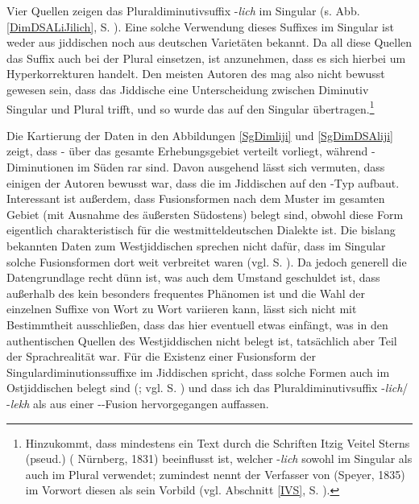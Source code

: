 Vier Quellen zeigen das Pluraldiminutivsuffix -\textit{lich} im Singular (s. Abb. \ref{DimDSALiJilich}, S. \pageref{DimDSALiJilich}). Eine solche Verwendung dieses Suffixes im Singular ist weder aus jiddischen noch aus deutschen Varietäten bekannt. Da all diese Quellen das Suffix auch  bei der  Plural einsetzen, ist anzunehmen, dass es sich hierbei um Hyperkorrekturen handelt.\label{lichHyper} Den meisten Autoren des  mag also nicht bewusst gewesen sein, dass das Jiddische eine Unterscheidung zwischen Diminutiv Singular und Plural trifft, und so wurde das   auf den Singular übertragen.\footnote{Hinzukommt, dass mindestens ein Text durch die Schriften Itzig Veitel Sterns (pseud.) (  Nürnberg, 1831) beeinflusst ist, welcher -\textit{lich} sowohl im Singular als auch im Plural verwendet; zumindest nennt der Verfasser von  (Speyer, 1835) im Vorwort diesen als sein Vorbild (vgl. Abschnitt \ref{IVS}, S. \pageref{IVS}).} 

Die Kartierung der Daten in den Abbildungen \ref{SgDimliji} und \ref{SgDimDSAliji} zeigt, dass - über das gesamte Erhebungsgebiet verteilt vorliegt, während -Diminutionen im Süden rar sind. Davon ausgehend lässt sich vermuten, dass einigen der Autoren bewusst war, dass die  im Jiddischen auf den -Typ aufbaut. Interessant ist außerdem, dass Fusionsformen nach dem Muster  im gesamten Gebiet (mit Ausnahme des äußersten Südostens) belegt sind, obwohl diese Form eigentlich charakteristisch für die westmitteldeutschen Dialekte ist. Die bislang bekannten Daten zum Westjiddischen sprechen nicht dafür, dass im Singular solche Fusionsformen dort weit verbreitet waren (vgl. S. \pageref{DIMSGWJ}). Da jedoch generell die Datengrundlage recht dünn ist, was auch dem Umstand geschuldet ist, dass  außerhalb des  kein besonders frequentes Phänomen ist und die Wahl der einzelnen Suffixe von Wort zu Wort variieren kann, lässt sich nicht mit Bestimmtheit ausschließen, dass das  hier eventuell etwas einfängt, was in den authentischen Quellen des Westjiddischen nicht belegt ist, tatsächlich aber Teil der Sprachrealität war. Für die Existenz einer Fusionsform der Singulardiminutionssuffixe im Jiddischen spricht, dass solche Formen auch im Ostjiddischen belegt sind (\cite[122, Karten 36S1, 36S2]{Herzog2000}; vgl. S. \pageref{SOJDIM}) und dass ich das Pluraldiminutivsuffix -\textit{lich}/ -\textit{lekh} als aus einer --Fusion hervorgegangen auffassen.


